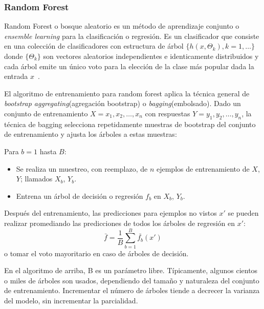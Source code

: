 \subsubsection{Random Forest}

	Random Forest o bosque aleatorio es un método de aprendizaje conjunto o\textit{ ensemble learning} para la clasificación o regresión. Es un clasificador que consiste en una colección de clasificadores con estructura de árbol $\{h(x,\Theta_k), k = 1,\dots\}$ donde $\{\Theta_k\}$ son vectores aleatorios independientes e identicamente distribuidos y cada árbol emite un único voto para la elección de la clase más popular dada la entrada $x$~\cite{Breiman01}.

	El algoritmo de entrenamiento para random forest aplica la técnica general de \textit{bootstrap aggregating}(agregación bootstrap) o \textit{bagging}(embolsado). Dado un conjunto de entrenamiento $X = x_1, x_2, \dots, x_n $ con respuestas $ Y = y_1, y_2, \dots, y_n $, la técnica de bagging selecciona repetidamente muestras de bootstrap del conjunto de entrenamiento y ajusta los árboles a estas muestras:
	
	Para $b=1$ hasta $B$:
	\begin{itemize}
		\item Se realiza un muestreo, con reemplazo, de $n$ ejemplos de entrenamiento de $X$, $Y$; llamados $X_b$, $Y_b$.
		\item Entrena un árbol de decisión o regresión $f_b$ en $X_b$, $Y_b$.
	\end{itemize}
	
	Después del entrenamiento, las predicciones para ejemplos no vistos $x'$ se pueden realizar promediando las predicciones de todos los árboles de regresión en $x'$:
	$$\bar{f} = \frac{1}{B}\sum_{b=1}^B\bar{f_b}(x')$$
	o tomar el voto mayoritario en caso de árboles de decisión.
	
	En el algoritmo de arriba, B es un parámetro libre. Típicamente, algunos cientos o miles de árboles son usados, dependiendo del tamaño y naturaleza del conjunto de entrenamiento. Incrementar el número de árboles tiende a decrecer la varianza del modelo, sin incrementar la parcialidad.
		
